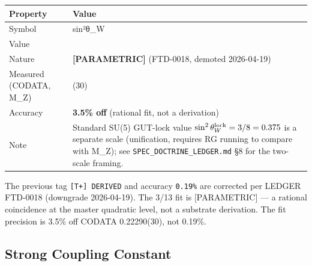 \documentclass[
  11pt,
  letterpaper,
  twoside,
  openright]{book}
\begin{document}
\begin{longtable}[]{@{}
  >{\raggedright\arraybackslash}p{}
  >{\raggedright\arraybackslash}p{}@{}}
\toprule\noalign{}
\begin{minipage}[b]{\linewidth}\raggedright
Property
\end{minipage} & \begin{minipage}[b]{\linewidth}\raggedright
Value
\end{minipage} \\
\midrule\noalign{}
\endhead
\bottomrule\noalign{}
\endlastfoot
Symbol & sin²θ\_W \\
Value & 0.2308 \\
Nature & \textbf{{[}PARAMETRIC{]}} (FTD-0018, demoted 2026-04-19) \\
Measured (CODATA, M\_Z) & 0.22290(30) \\
Accuracy & \textbf{3.5\% off} (rational fit, not a derivation) \\
Note & Standard SU(5) GUT-lock value
\(\sin^2\theta_W^{\rm lock} = 3/8 = 0.375\) is a separate scale
(unification, requires RG running to compare with M\_Z); see
\texttt{SPEC\_DOCTRINE\_LEDGER.md} §8 for the two-scale framing. \\
\end{longtable}

\begin{tcolorbox}[enhanced jigsaw, coltitle=black, colbacktitle=quarto-callout-warning-color!10!white, toprule=.15mm, colframe=quarto-callout-warning-color-frame, arc=.35mm, opacityback=0, bottomtitle=1mm, toptitle=1mm, breakable, colback=white, titlerule=0mm, opacitybacktitle=0.6, title=\textcolor{quarto-callout-warning-color}{\faExclamationTriangle}\hspace{0.5em}{Earlier ``DERIVED at 0.19\%'' framing was wrong}, rightrule=.15mm, bottomrule=.15mm, leftrule=.75mm, left=2mm]

The previous tag \texttt{{[}T+{]}\ DERIVED} and accuracy \texttt{0.19\%}
are corrected per LEDGER FTD-0018 (downgrade 2026-04-19). The 3/13 fit
is {[}PARAMETRIC{]} --- a rational coincidence at the master quadratic
level, not a substrate derivation. The fit precision is 3.5\% off CODATA
0.22290(30), not 0.19\%.

\end{tcolorbox}

\subsection{Strong Coupling Constant}\label{strong-coupling-constant}
\end{document}
